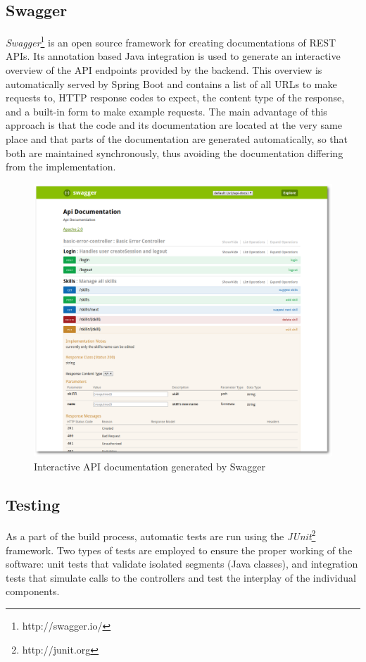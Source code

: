 \subsection{Swagger}
\textit{Swagger}\footnote{http://swagger.io/} is an open source framework for creating documentations of REST APIs.
Its annotation based Java integration is used to generate an interactive overview of the API endpoints provided by the
backend. This overview is automatically served by Spring Boot and contains a list of all URLs to make requests to, HTTP response codes to expect, the content type of the response, and a built-in form to make example requests. The main advantage of this approach is that the code and its documentation are located at the very same place and that parts of the documentation are generated automatically, so that both are maintained synchronously, thus avoiding the documentation differing from the implementation.
\begin{figure}[H]
    \centering
    \includegraphics[width=\textwidth]{images/swagger_ui.png}
    \caption[Screenshot: Swagger Interactive Documentation]{Interactive API documentation generated by Swagger}
    \label{fig:markovchain}
\end{figure}

\subsection{Testing}
As a part of the build process, automatic tests are run using the \textit{JUnit}\footnote{http://junit.org} framework. Two types of tests are employed to ensure the proper working of the software: unit tests that validate isolated segments (Java classes), and integration tests that simulate calls to the controllers and test the
interplay of the individual components.

